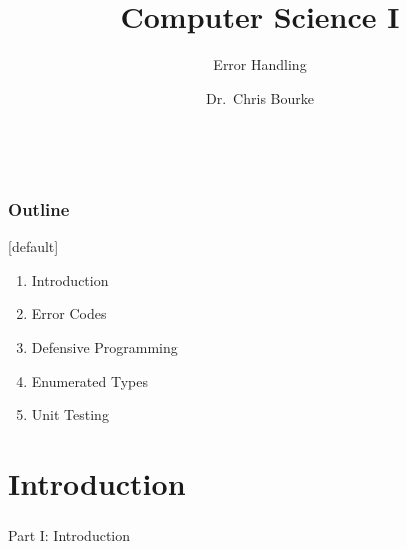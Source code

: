 \documentclass[]{beamer}
\title[~]{Computer Science I}
\subtitle{Error Handling}
\author[~]{Dr.\ Chris Bourke\\ \email{cbourke@cse.unl.edu}} %
\date{~}
\begin{document}
\begin{frame}
  \titlepage
\end{frame}


\begin{frame}
  \frametitle{Outline}

[default]
\begin{enumerate}
  \item Introduction
  \item Error Codes
  \item Defensive Programming
  \item Enumerated Types
  \item Unit Testing
\end{enumerate}

\end{frame}

\section{Introduction}

\begin{frame}
    \frametitle{}
    \framesubtitle{}
    
    \begin{center}
    {\Huge Part I: Introduction}\\
    {\Large ~}
    \end{center}

\end{frame}
\end{document}
